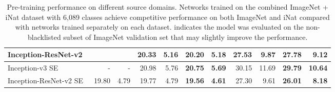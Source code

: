 \documentclass[10pt,twocolumn,letterpaper]{article}
\begin{document}
\begin{table*}[t]
\begin{center}
\begin{tabular}{ lcccccccccc }
\multicolumn{1}{l}{Inception-ResNet-v2~\cite{inception-v4}} & \multicolumn{1}{|r}{} & \multicolumn{1}{|r}{} & \multicolumn{1}{|r}{20.33} & \multicolumn{1}{|r}{\textbf{5.16}} & \multicolumn{1}{|r}{\textbf{20.20}} & \multicolumn{1}{|r}{5.18} & \multicolumn{1}{|r}{\textbf{27.53}} & \multicolumn{1}{|r}{9.87} & \multicolumn{1}{|r}{27.78} & \multicolumn{1}{|r}{\textbf{9.12}} \\ \hline \hline
\multicolumn{1}{l}{Inception-v3 SE~\cite{senet}} & \multicolumn{1}{|r}{-} & \multicolumn{1}{|r}{-}  & \multicolumn{1}{|r}{20.98} & \multicolumn{1}{|r}{5.76} & \multicolumn{1}{|r}{\textbf{20.75}} & \multicolumn{1}{|r}{\textbf{5.69}} & \multicolumn{1}{|r}{30.15} & \multicolumn{1}{|r}{11.69} & \multicolumn{1}{|r}{\textbf{29.79}} & \multicolumn{1}{|r}{\textbf{10.64}} \\
\multicolumn{1}{l}{Inception-ResNet-v2 SE~\cite{senet}} & \multicolumn{1}{|r}{19.80} & \multicolumn{1}{|r}{4.79} & \multicolumn{1}{|r}{19.77} & \multicolumn{1}{|r}{4.79} & \multicolumn{1}{|r}{\textbf{19.56}} & \multicolumn{1}{|r}{\textbf{4.61}} & \multicolumn{1}{|r}{27.30} & \multicolumn{1}{|r}{9.61} & \multicolumn{1}{|r}{\textbf{26.01}} & \multicolumn{1}{|r}{\textbf{8.18}} \\ \hline
\end{tabular}
\end{center}
\caption{Pre-training performance on different source domains. Networks trained on the combined ImageNet + iNat dataset with 6,089 classes achieve competitive performance on both ImageNet and iNat compared with networks trained separately on each dataset.  indicates the model was evaluated on the non-blacklisted subset of ImageNet validation set that may slightly improve the performance.}
\label{tab:joint_training}
\end{table*}
\end{document}
